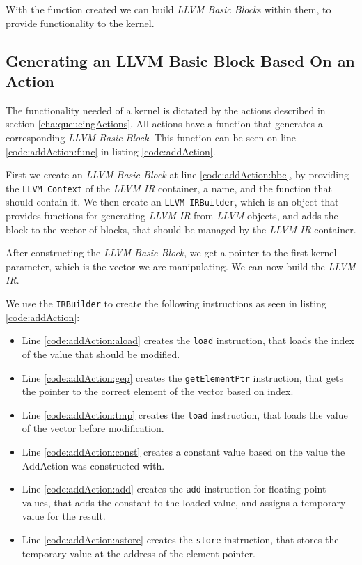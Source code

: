 With the function created we can build \textit{LLVM Basic Block}s within them, to provide functionality to the kernel.

\subsection{Generating an LLVM Basic Block Based On an Action} \label{sec:bbbuilding}
The functionality needed of a kernel is dictated by the actions described in section \ref{cha:queueingActions}. All actions have a function that generates a corresponding \textit{LLVM Basic Block}. This function can be seen on line \ref{code:addAction:func} in listing \ref{code:addAction}.

First we create an \textit{LLVM Basic Block} at line \ref{code:addAction:bbc}, by providing the \texttt{LLVM Context} of the \textit{LLVM IR} container, a name, and the function that should contain it. We then create an \texttt{LLVM IRBuilder}, which is an object that provides functions for generating \textit{LLVM IR} from \textit{LLVM} objects, and adds the block to the vector of blocks, that should be managed by the \textit{LLVM IR} container.

After constructing the \textit{LLVM Basic Block}, we get a pointer to the first kernel parameter, which is the vector we are manipulating. We can now build the \textit{LLVM IR}.

We use the \texttt{IRBuilder} to create the following instructions as seen in listing \ref{code:addAction}:
\begin{itemize}
\item Line \ref{code:addAction:aload} creates the \texttt{load} instruction, that loads the index of the value that should be modified.
\item Line \ref{code:addAction:gep} creates the \texttt{getElementPtr} instruction, that gets the pointer to the correct element of the vector based on index.
\item Line \ref{code:addAction:tmp} creates the \texttt{load} instruction, that loads the value of the vector before modification.
\item Line \ref{code:addAction:const} creates a constant value based on the value the AddAction was constructed with.
\item Line \ref{code:addAction:add} creates the \texttt{add} instruction for floating point values, that adds the constant to the loaded value, and assigns a temporary value for the result.
\item Line \ref{code:addAction:astore} creates the \texttt{store} instruction, that stores the temporary value at the address of the element pointer.
\end{itemize}

